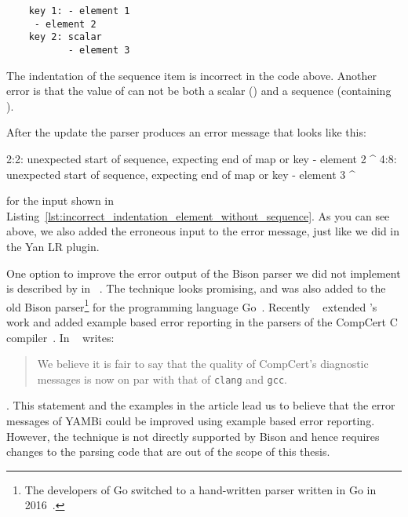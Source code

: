 \begin{listing}
  \begin{verbatim}
    key 1: - element 1
     - element 2
    key 2: scalar
           - element 3
  \end{verbatim}
  \caption{The indentation of the sequence item  is incorrect in the code above. Another error is that the value of  can not be both a scalar () and a sequence (containing ).}
  \label{lst:incorrect_indentation_element_without_sequence}
\end{listing}

After the update the parser produces an error message that looks like this:

\begin{textcode}
2:2: unexpected start of sequence, expecting end of map or key
      - element 2
      ^
4:8: unexpected start of sequence, expecting end of map or key
            - element 3
            ^
\end{textcode}

for the input shown in Listing~\ref{lst:incorrect_indentation_element_without_sequence}. As you can see above, we also added the erroneous input to the error message, just like we did in the Yan LR plugin.

One option to improve the error output of the Bison parser we did not implement is described by \citeauthor{jeffery2003generating} in ~\cite{jeffery2003generating}. The technique looks promising, and was also added to the old Bison parser\footnote{The developers of Go switched to a hand-written parser written in Go in 2016~\cite{pike2017reddit, go2016release}.} for the programming language Go~\cite{cox2010errors}. Recently \citeauthor{pottier2016reachability}~\cite{pottier2016reachability} extended \citeauthor{jeffery2003generating}’s work and added example based error reporting in the  parsers of the CompCert C compiler~\cite{kaestner2018compcert}. In  \citeauthor{pottier2016reachability}~\cite{pottier2016reachability} writes:

\begin{quote}
  We believe it is fair to say that the quality of CompCert’s diagnostic messages is now on par with that of \texttt{clang} and \texttt{gcc}.
\end{quote}

. This statement and the examples in the article lead us to believe that the error messages of YAMBi could be improved using example based error reporting. However, the technique is not directly supported by Bison and hence requires changes to the parsing code that are out of the scope of this thesis.

